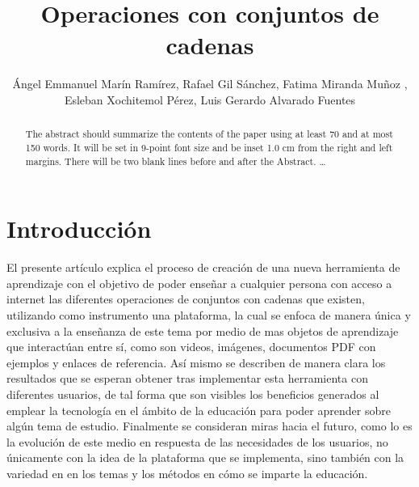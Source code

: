 \documentclass{llncs}
\begin{document}
\title{Operaciones con conjuntos de cadenas}
%
%
\author{Ángel Emmanuel Marín Ramírez, Rafael Gil Sánchez, Fatima Miranda Muñoz , Esleban Xochitemol Pérez, Luis Gerardo Alvarado Fuentes
}
%
%
%

\maketitle              %

\begin{abstract}
The abstract should summarize the contents of the paper
using at least 70 and at most 150 words. It will be set in 9-point
font size and be inset 1.0 cm from the right and left margins.
There will be two blank lines before and after the Abstract. \dots

\end{abstract}
%
\section{Introducción}
%
El presente artículo explica el proceso de creación de una nueva herramienta de aprendizaje con el objetivo de poder enseñar a cualquier persona con acceso a internet las diferentes operaciones de conjuntos con cadenas que existen, utilizando como instrumento una plataforma, la cual se enfoca de manera única y exclusiva a la enseñanza de este tema por medio de mas objetos de aprendizaje que interactúan entre sí, como son videos, imágenes, documentos PDF con ejemplos y enlaces de referencia. Así mismo se describen de manera clara los resultados que se esperan obtener tras implementar esta herramienta con diferentes usuarios, de tal forma que son visibles los beneficios generados al emplear la tecnología en el ámbito de la educación  para poder aprender sobre algún tema de estudio.
Finalmente se consideran miras hacia el futuro, como lo es la evolución de este medio en respuesta de las necesidades de los usuarios, no únicamente con la idea de la plataforma que se implementa, sino también con la variedad en en los temas y los métodos en cómo se imparte la educación.
\end{document}

